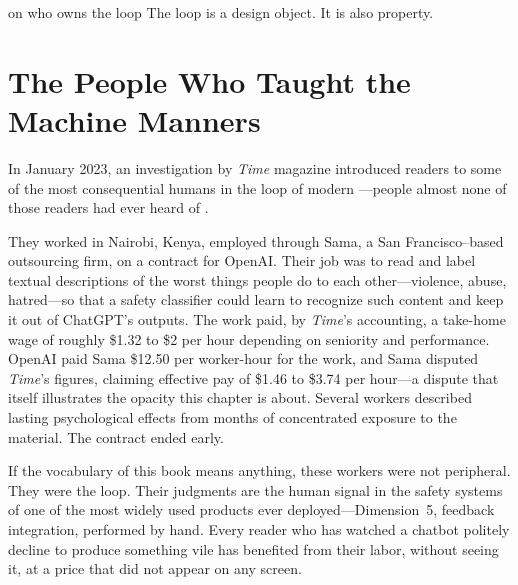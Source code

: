 
\label{chap:ch18}
\begin{chapterquote}{on who owns the loop}
The loop is a design object. It is also property.
\end{chapterquote}

\section{The People Who Taught the Machine Manners}
\label{sec:ch18-nairobi}

In January 2023, an investigation by \textit{Time} magazine introduced readers to some of the most consequential humans in the loop of modern \ai---people almost none of those readers had ever heard of \autocite{perrigo2023kenya}.

They worked in Nairobi, Kenya, employed through Sama, a San Francisco--based outsourcing firm, on a contract for OpenAI. Their job was to read and label textual descriptions of the worst things people do to each other---violence, abuse, hatred---so that a safety classifier could learn to recognize such content and keep it out of ChatGPT's outputs. The work paid, by \textit{Time}'s accounting, a take-home wage of roughly \$1.32 to \$2 per hour depending on seniority and performance. OpenAI paid Sama \$12.50 per worker-hour for the work, and Sama disputed \textit{Time}'s figures, claiming effective pay of \$1.46 to \$3.74 per hour---a dispute that itself illustrates the opacity this chapter is about. Several workers described lasting psychological effects from months of concentrated exposure to the material. The contract ended early.

If the vocabulary of this book means anything, these workers were not peripheral. They were the loop. Their judgments are the human signal in the safety systems of one of the most widely used \ai products ever deployed---Dimension~5, feedback integration, performed by hand. Every reader who has watched a chatbot politely decline to produce something vile has benefited from their labor, without seeing it, at a price that did not appear on any screen.

